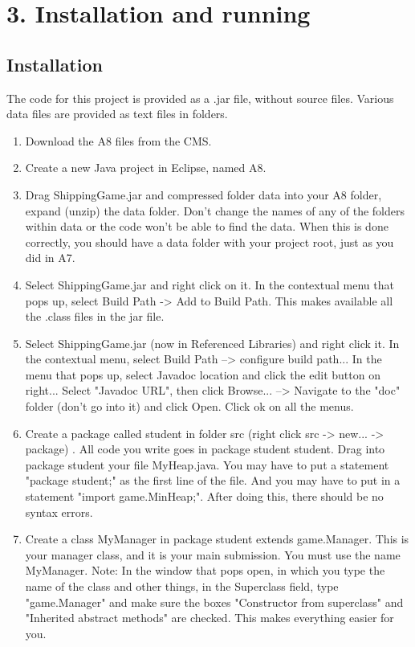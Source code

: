 \documentclass[11pt]{article}
\begin{document}
\section{3. Installation and running}
\subsection{Installation}
The code for this project is provided as a .jar file, without source files. Various data files are provided as text files in folders.
\begin{enumerate}
\item Download the A8 files from the CMS.
\item Create a new Java project in Eclipse, named A8. 
\item Drag ShippingGame.jar and compressed folder data into your A8 folder, expand (unzip) the data folder. Don't change
the names of any of the folders within data or the code won't be able to find the data. When this is done correctly, you should have a data folder with your project root, just as you did in A7.
\item Select ShippingGame.jar and right click on it. In the contextual menu that
pops up, select Build Path -> Add to Build Path. This makes available all
the .class files in the jar file.
\item Select ShippingGame.jar (now in Referenced Libraries) and right click it. In the contextual menu, select Build Path --> configure build path... In the menu that pops up, select Javadoc location and click the edit button on right... Select "Javadoc URL", then click Browse... --> Navigate to the "doc" folder (don't go into it) and click Open. Click ok on all the menus.
\item Create a package called student in folder src (right click src -> new... ->
package) . All code you write goes in package student student. Drag into
package student your file MyHeap.java. You may have to put a statement
"package student;" as the first line of the file. And you may have to put in
a statement "import game.MinHeap;". After doing this, there should be no
syntax errors.
\item Create a class MyManager in package student extends game.Manager.
This is your manager class, and it is your main submission. You must use
the name MyManager.
Note: In the window that pops open, in which you type the name of the
class and other things, in the Superclass field, type "game.Manager" and
make sure the boxes "Constructor from superclass" and "Inherited abstract
methods" are checked. This makes everything easier for you.
\end{enumerate}
\end{document}

